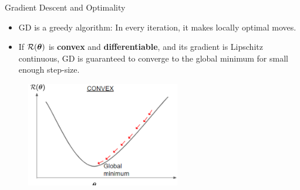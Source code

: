 \documentclass[11pt,compress,t,notes=noshow, xcolor=table]{beamer}
\begin{document}
%		
%		
%		
	\begin{vbframe}{Gradient Descent and Optimality}
	
	\begin{itemize}
		\item GD is a greedy algorithm: In every iteration, it makes locally optimal moves.
		\vspace*{0.5mm}
		\item If $\mathcal{R}(\bm{\theta})$ is \textbf{convex} and \textbf{differentiable}, and its gradient is Lipschitz continuous, GD is guaranteed to converge to the global minimum for small enough step-size.  
	\end{itemize}
	
	\begin{figure}
		\centering
		\includegraphics[width=0.6\textwidth]{figure_man/gdes_1.png}
	\end{figure}

	\end{vbframe}
			
	
	
	\endlecture
\end{document}
